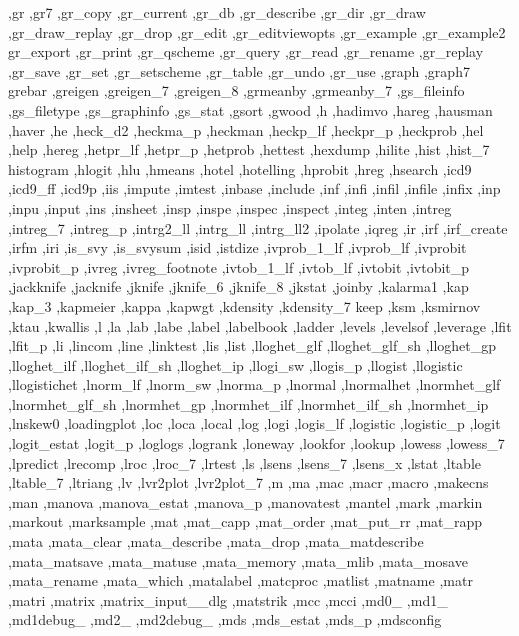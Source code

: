 {{    ,gr ,gr7 ,gr_copy ,gr_current ,gr_db ,gr_describe ,gr_dir ,gr_draw
    ,gr_draw_replay ,gr_drop ,gr_edit ,gr_editviewopts ,gr_example
    ,gr_example2 gr_export ,gr_print ,gr_qscheme ,gr_query ,gr_read
    ,gr_rename ,gr_replay ,gr_save ,gr_set ,gr_setscheme ,gr_table
    ,gr_undo ,gr_use ,graph ,graph7 grebar ,greigen ,greigen_7
    ,greigen_8 ,grmeanby ,grmeanby_7 ,gs_fileinfo ,gs_filetype
    ,gs_graphinfo ,gs_stat ,gsort ,gwood ,h ,hadimvo ,hareg ,hausman
    ,haver ,he ,heck_d2 ,heckma_p ,heckman ,heckp_lf ,heckpr_p ,heckprob
    ,hel ,help ,hereg ,hetpr_lf ,hetpr_p ,hetprob ,hettest ,hexdump
    ,hilite ,hist ,hist_7 histogram ,hlogit ,hlu ,hmeans ,hotel
    ,hotelling ,hprobit ,hreg ,hsearch ,icd9 ,icd9_ff ,icd9p ,iis
    ,impute ,imtest ,inbase ,include ,inf ,infi ,infil ,infile ,infix
    ,inp ,inpu ,input ,ins ,insheet ,insp ,inspe ,inspec ,inspect ,integ
    ,inten ,intreg ,intreg_7 ,intreg_p ,intrg2_ll ,intrg_ll ,intrg_ll2
    ,ipolate ,iqreg ,ir ,irf ,irf_create ,irfm ,iri ,is_svy ,is_svysum
    ,isid ,istdize ,ivprob_1_lf ,ivprob_lf ,ivprobit ,ivprobit_p ,ivreg
    ,ivreg_footnote ,ivtob_1_lf ,ivtob_lf ,ivtobit ,ivtobit_p ,jackknife
    ,jacknife ,jknife ,jknife_6 ,jknife_8 ,jkstat ,joinby ,kalarma1
    ,kap ,kap_3 ,kapmeier ,kappa ,kapwgt ,kdensity ,kdensity_7 keep
    ,ksm ,ksmirnov ,ktau ,kwallis ,l ,la ,lab ,labe ,label ,labelbook
    ,ladder ,levels ,levelsof ,leverage ,lfit ,lfit_p ,li ,lincom ,line
    ,linktest ,lis ,list ,lloghet_glf ,lloghet_glf_sh ,lloghet_gp
    ,lloghet_ilf ,lloghet_ilf_sh ,lloghet_ip ,llogi_sw ,llogis_p
    ,llogist ,llogistic ,llogistichet ,lnorm_lf ,lnorm_sw ,lnorma_p
    ,lnormal ,lnormalhet ,lnormhet_glf ,lnormhet_glf_sh ,lnormhet_gp
    ,lnormhet_ilf ,lnormhet_ilf_sh ,lnormhet_ip ,lnskew0 ,loadingplot
    ,loc ,loca ,local ,log ,logi ,logis_lf ,logistic ,logistic_p
    ,logit ,logit_estat ,logit_p ,loglogs ,logrank ,loneway ,lookfor
    ,lookup ,lowess ,lowess_7 ,lpredict ,lrecomp ,lroc ,lroc_7 ,lrtest
    ,ls ,lsens ,lsens_7 ,lsens_x ,lstat ,ltable ,ltable_7 ,ltriang
    ,lv ,lvr2plot ,lvr2plot_7 ,m ,ma ,mac ,macr ,macro ,makecns ,man
    ,manova ,manova_estat ,manova_p ,manovatest ,mantel ,mark ,markin
    ,markout ,marksample ,mat ,mat_capp ,mat_order ,mat_put_rr ,mat_rapp
    ,mata ,mata_clear ,mata_describe ,mata_drop ,mata_matdescribe
    ,mata_matsave ,mata_matuse ,mata_memory ,mata_mlib ,mata_mosave
    ,mata_rename ,mata_which ,matalabel ,matcproc ,matlist ,matname
    ,matr ,matri ,matrix ,matrix_input__dlg ,matstrik ,mcc ,mcci ,md0_
    ,md1_ ,md1debug_ ,md2_ ,md2debug_ ,mds ,mds_estat ,mds_p ,mdsconfig
}}

